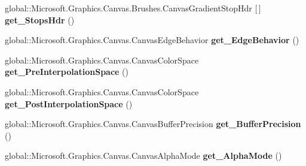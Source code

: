 \begin{DoxyCompactItemize}
global\+::\+Microsoft.\+Graphics.\+Canvas.\+Brushes.\+Canvas\+Gradient\+Stop\+Hdr \mbox{[}$\,$\mbox{]} {\bfseries get\+\_\+\+Stops\+Hdr} ()
\item 
\mbox{\label{interface_microsoft_1_1_graphics_1_1_canvas_1_1_brushes_1_1_i_canvas_linear_gradient_brush_a9f8af02ad0512ad6ea1051030ea8d8b5}} 
global\+::\+Microsoft.\+Graphics.\+Canvas.\+Canvas\+Edge\+Behavior {\bfseries get\+\_\+\+Edge\+Behavior} ()
\item 
\mbox{\label{interface_microsoft_1_1_graphics_1_1_canvas_1_1_brushes_1_1_i_canvas_linear_gradient_brush_a4fae3e034b5a7682ce6f36b1b53ca7f2}} 
global\+::\+Microsoft.\+Graphics.\+Canvas.\+Canvas\+Color\+Space {\bfseries get\+\_\+\+Pre\+Interpolation\+Space} ()
\item 
\mbox{\label{interface_microsoft_1_1_graphics_1_1_canvas_1_1_brushes_1_1_i_canvas_linear_gradient_brush_af17f5053ad253aed98e1a18bd5e60b8f}} 
global\+::\+Microsoft.\+Graphics.\+Canvas.\+Canvas\+Color\+Space {\bfseries get\+\_\+\+Post\+Interpolation\+Space} ()
\item 
\mbox{\label{interface_microsoft_1_1_graphics_1_1_canvas_1_1_brushes_1_1_i_canvas_linear_gradient_brush_a5b2b98092e712966b733302d129af2bc}} 
global\+::\+Microsoft.\+Graphics.\+Canvas.\+Canvas\+Buffer\+Precision {\bfseries get\+\_\+\+Buffer\+Precision} ()
\item 
\mbox{\label{interface_microsoft_1_1_graphics_1_1_canvas_1_1_brushes_1_1_i_canvas_linear_gradient_brush_a532e44644b9768234226a878bed13561}} 
global\+::\+Microsoft.\+Graphics.\+Canvas.\+Canvas\+Alpha\+Mode {\bfseries get\+\_\+\+Alpha\+Mode} ()
\item 
\mbox{\label{interface_microsoft_1_1_graphics_1_1_canvas_1_1_brushes_1_1_i_canvas_linear_gradient_brush_a4c95714cff8fe9867956a7f25cd99030}} 

\end{DoxyCompactItemize}
